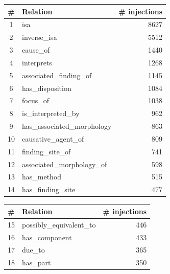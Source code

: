 \documentclass[10pt]{article}
\begin{document}
\begin{appendices}
\begin{table}[t!]
  \setlength{\tabcolsep}{4pt}
  \begin{subtable}[t]{0.48\textwidth}
    \centering
    \small
    \label{tab:qwen32b_train_relstats_1}
    \begin{tabular}{c l r}
      \toprule
      \rowcolor{gray!30}
      \# & Relation & \# injections \\
      \midrule
       1 & isa                          & 8627 \\
       2 & inverse\_isa                 & 5512 \\
       3 & cause\_of                    & 1440 \\
       4 & interprets                   & 1268 \\
       5 & associated\_finding\_of      & 1145 \\
       6 & has\_disposition             & 1084 \\
       7 & focus\_of                    & 1038 \\
       8 & is\_interpreted\_by          & 962  \\
       9 & has\_associated\_morphology  & 863  \\
      10 & causative\_agent\_of         & 809  \\
      11 & finding\_site\_of            & 741  \\
      12 & associated\_morphology\_of   & 598  \\
      13 & has\_method                  & 515  \\
      14 & has\_finding\_site           & 477  \\
      \bottomrule
    \end{tabular}
  \end{subtable}\hfill
  \begin{subtable}[t]{0.48\textwidth}
    \centering
    \small
    \label{tab:qwen32b_train_relstats_2}
    \begin{tabular}{c l r}
      \toprule
      \rowcolor{gray!30}
      \# & Relation & \# injections \\
      \midrule
      15 & possibly\_equivalent\_to     & 446 \\
      16 & has\_component               & 433 \\
      17 & due\_to                      & 365 \\
      18 & has\_part                    & 350 \\

\end{tabular}
\end{subtable}
\end{table}
\end{appendices}
\end{document}
